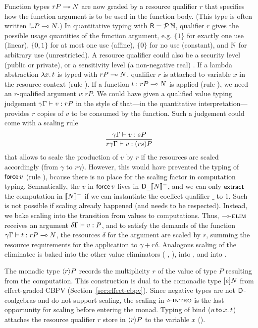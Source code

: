 \documentclass[acmsmall,review,anonymous]{acmart}\settopmatter{printfolios=true,printccs=false,printacmref=false}
\theoremstyle{remark}
\begin{document}
Function types $\qfun r P N$ are now graded by a resource qualifier
$r$ that specifies how the function argument is to be used in the
function body.  (This type is often written $!_{r}P \lolli N$.)  In
quantitative typing with $\R = \Pot \bN$, qualifier $r$ gives the
possible usage quantities of the function argument, e.g. $\{1\}$ for
exactly one use (linear), $\{0,1\}$ for at most one use (affine),
$\{0\}$ for no use (constant), and $\bN$ for arbitrary use
(unrestricted).  A resource qualifier could also be a security level
(public or private), or a sensitivity level (a non-negative real)
\citep{reedPierce:icfp10}.  If a lambda abstraction $\lam x t$ is
typed with $\qfun r P N$, qualifier $r$ is attached to variable $x$ in
the resource context (rule \rintro\lolli).  If a function
$t : \qfun r P N$ is applied (rule \relim\lolli), we need an
$r$-qualified argument $v : rP$.  We could have given a qualified
value typing judgement $\qValTy \gamma \Gamma v {rP}$ in the style of
\citet{mcBride:wadler60} that---in the quantitative
interpretation---provides $r$ copies of $v$ to be consumed by the
function.  Such a judgement could come with a scaling rule
\[
\ru{\qValTy \gamma \Gamma v {sP}
  }{\qValTy{r\gamma}\Gamma v {(rs)P}}
\]
that allows to scale the production of $v$ by $r$ if the resources are
scaled accordingly (from $\gamma$ to $r\gamma$).
%
However, this would have prevented the typing of $\force v$ (rule
\relim\Box), bcause there is no place for the scaling factor in
computation typing.  Semantically, the $v$ in $\force v$
lives in $\D[\_]\denn N$, and
we can only $\textract$ the computation in $\denn N$ if we can
instantiate the coeffect qualifier $\_$ to $1$.  Such is not possible
if scaling already happened (and needs to be respected).
%
Instead, we bake scaling
into the transition from values to computations.
Thus, $\relim\lolli$ receives an
argument $\qValTy \delta \Gamma v P$, and to satisfy the demands of
the function $\qCompTy \gamma \Gamma t {\qfun r P N}$, the resources
$\delta$ for the argument are scaled by $r$, summing the resource
requirements for the application to $\gamma + r\delta$.
%
Analogous scaling of the eliminatee is baked into the other value
eliminators (%
\relim\GS, \relim\otimes), into %
 \rlet,
and into \rintro\diamond.

The monadic type $\compty r P$ records the multiplicity $r$ of the
value of type $P$ resulting from the computation.  This construction
is dual to the comonadic type $\thunkty e N$ from effect-graded CBPV
(Section~\ref{sec:effect-cbpv}).  Since negative types are not
$\D$-coalgebras and do not support scaling, the scaling in
$\rintro\diamond$ is the last opportunity for scaling before entering
the monad.  Typing of bind ($\bind x u t$) attaches the resource qualifier $r$ store in $\compty r P$ to the variable $x$ (\relim\diamond).
\end{document}
